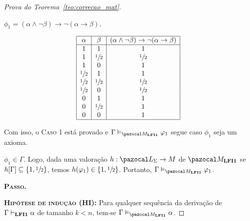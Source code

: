 \begin{proof}[Prova do Teorema~\ref{teo:correcao_mat}]
\begin{provaporcasos}
\begin{provaporsubcasos}
                \subcasodeprova{} $\phi_{1} = (\alpha \land \neg \beta) \to \neg(\alpha \to \beta)$.

                \begin{center}
                    \[
                        \begin{array}{|c|c|c|}%
                            \hline%
                            \alpha      & \beta & (\alpha \land \neg \beta) \to \neg(\alpha \to \beta) \\
                            \hline%
                            1 & 1 & 1\\
                            1 & \meio{} & \meio{}\\
                            1 & 0 & 1\\
                            \meio{} & 1 & 1\\
                            \meio{} & \meio{} &\meio{}\\ 
                            \meio{} & 0 & \meio{}\\
                            0 & 1 & 1\\
                            0 & \meio{} & 1\\
                            0 & 0 & 1\\
                            \hline%
                        \end{array}
                    \]
                \end{center}
                
            \end{provaporsubcasos}

            Com isso, o \textsc{Caso 1} está provado e $\Gamma \conmat \phi_{1}$ segue caso $\phi_{1}$ seja um axioma.

            \casodeprova{} $\phi_{1} \in \Gamma$. Logo, dada uma valoração $h : \ling{} \to M$ de $\mat{}$ se $h[\Gamma] \subseteq \{1, \sfrac{1}{2}{}\}$, temos $h(\varphi_{1}) \in \{1, \sfrac{1}{2}{}\}$. Portanto, $\Gamma \conmat \phi_{1}$.

        \end{provaporcasos}

         \noindent \textbf{\textsc{Passo.}}
         
         \noindent \textbf{\textsc{Hipótese de indução (HI):}} Para qualquer sequência da derivação de $\Gamma \vdash_{{\normalfont\textbf{LFI1}}{}} \alpha$ de tamanho $k < n$, tem-se $\Gamma \conmat \alpha$. 
         

\end{proof}
